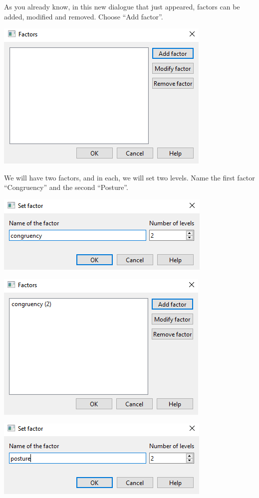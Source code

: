 \documentclass[
]{book}
\begin{document}
As you already know, in this new dialogue that just appeared, factors can be added, modified and removed. Choose ``Add factor''.

\includegraphics{img/ch10/10.5CRMV_factors_window.png}

We will have two factors, and in each, we will set two levels. Name the first factor ``Congruency'' and the second ``Posture''.

\includegraphics{img/ch10/10.5CRMV_setfactors.png}

\includegraphics{img/ch10/10.5CRMV_factors_set.png}

\includegraphics{img/ch10/873.png}
\end{document}
